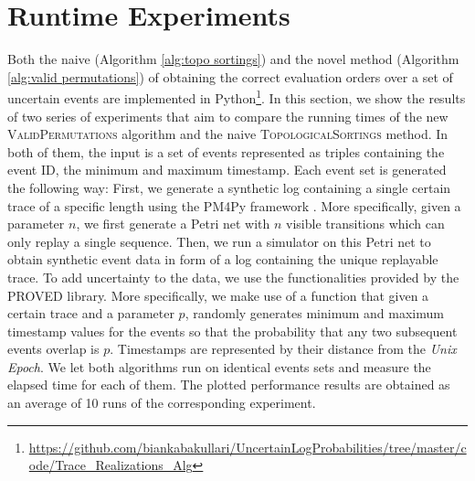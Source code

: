 \section{Runtime Experiments}
Both the naive (Algorithm \ref{alg:topo sortings}) and the novel method (Algorithm \ref{alg:valid permutations}) of obtaining the correct evaluation orders over a set of uncertain events are implemented in Python\footnote{\url{https://github.com/biankabakullari/UncertainLogProbabilities/tree/master/code/Trace_Realizations_Alg}}.
In this section, we show the results of two series of experiments that aim to compare the running times of the new \textsc{ValidPermutations} algorithm and the naive \textsc{TopologicalSortings} method.
In both of them, the input is a set of events represented as triples containing the event ID, the minimum and maximum timestamp.
Each event set is generated the following way: First, we generate a synthetic log containing a single certain trace of a specific length using the PM4Py framework \cite{pm4py}.
More specifically, given a parameter $n$, we first generate a Petri net with $n$ visible transitions which can only replay a single sequence.
Then, we run a simulator on this Petri net to obtain synthetic event data in form of a log containing the unique replayable trace.
To add uncertainty to the data, we use the functionalities provided by the PROVED \cite{proved} library.
More specifically, we make use of a function that given a certain trace and a parameter $p$, randomly generates minimum and maximum timestamp values for the events so that the probability that any two subsequent events overlap is $p$.
Timestamps are represented by their distance from the \textit{Unix Epoch}.
We let both algorithms run on identical events sets and measure the elapsed time for each of them.
The plotted performance results are obtained as an average of 10 runs of the corresponding experiment.

